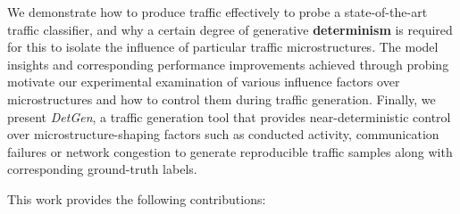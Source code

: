 \documentclass[runningheads]{llncs}
\begin{document}
We demonstrate how to produce traffic effectively to probe a state-of-the-art traffic classifier, and why a certain degree of generative \textbf{determinism} is required for this to isolate the influence of particular traffic microstructures. The model insights and corresponding performance improvements achieved through probing motivate our experimental examination of various influence factors over microstructures and how to control them during traffic generation. Finally, we present \emph{DetGen}, a traffic generation tool that provides near-deterministic control over microstructure-shaping factors such as conducted activity, communication failures or network congestion to generate reproducible traffic samples along with corresponding ground-truth labels. %




 
This work provides the following contributions:
\end{document}
